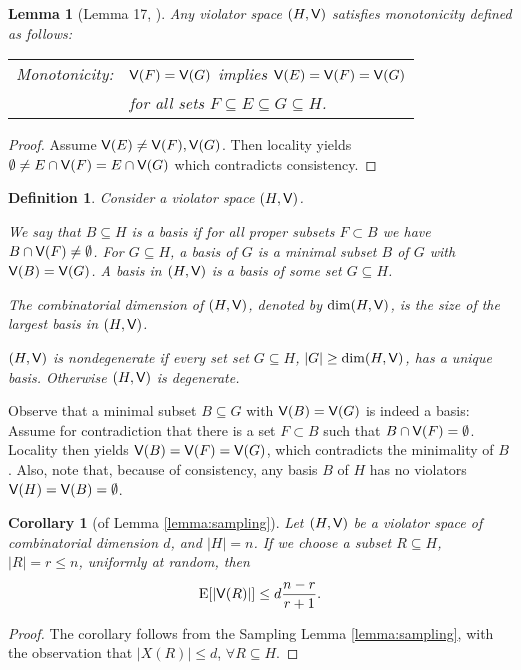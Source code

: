 \documentclass[12pt]{article}
\def\Exp{\qopname\relax m{E}}
\def\Violators{{\sf V}}
\newtheorem{lemma2}[theorem2]{Lemma}
\newenvironment{lemma}{\begin{lemma2}}{\end{lemma2}}
\newtheorem{corollary2}[theorem2]{Corollary}
\newenvironment{corollary}{\begin{corollary2}}{\end{corollary2}}
\newtheorem{definition2}[theorem2]{Definition}
\newenvironment{definition}{\begin{definition2}}{\end{definition2}}
\theoremstyle{remark}
\let\newItemize=\itemize
\renewenvironment{itemize}{\newItemize\itemsep=0.0cm}{\endlist}
\begin{document}
\begin{lemma}[Lemma 17, \cite{journals/dam/GartnerMRS08}]
\label{lemma:monotonicity}
Any violator space $(H,\Violators)$ satisfies \emph{monotonicity} defined as follows:

\vspace{0.2cm}
\begin{tabular}{ll}
	Monotonicity: & $\Violators(F) = \Violators(G)$ implies $\Violators(E) = \Violators(F)=
\Violators(G)$\\
	& for all sets $F\subseteq E \subseteq G \subseteq H$.
\end{tabular}  
\end{lemma}
\begin{proof}
Assume $\Violators(E)\neq\Violators(F),\Violators(G)$. Then locality yields
$\emptyset\neq E\cap\Violators(F)=E\cap \Violators(G)$ which contradicts consistency.
\end{proof}

\begin{definition}
Consider a violator space $(H,\Violators)$.
\begin{itemize}
\item[(i)]We say that $B\subseteq H$ is a \emph{basis}
if for all proper subsets $F\subset B$ we have $B\cap\Violators(F)\neq \emptyset$. For $G\subseteq 
H$, a basis of $G$ is a minimal subset $B$ of $G$ with $\Violators(B)=\Violators(G)$.
A basis in $(H,\Violators)$ is a basis of some set $G\subseteq H$.
\item[(ii)] The \emph{combinatorial dimension} of $(H,\Violators)$, denoted by $\dim(H,\Violators)$,
is the size of the largest basis in $(H,\Violators)$.
\item[(iii)] $(H,\Violators)$ is \emph{nondegenerate} if every set set $G\subseteq H$, $|G|\geq \dim(H,
\Violators)$,
has a unique basis. Otherwise $(H,\Violators)$ is \emph{degenerate}.
\end{itemize}
\end{definition}

Observe that a minimal subset $B\subseteq G$ with $\Violators(B)=\Violators(G)$ is indeed a basis:
Assume for contradiction that there is a set $F\subset B$ such that $B\cap\Violators(F)=\emptyset$.
Locality then yields $\Violators(B)=\Violators(F)=\Violators(G)$, which contradicts the minimality of $B$.
Also, note that, because of consistency, any basis $B$ of $H$ has no violators $\Violators(H)=\Violators(B) = \emptyset$.


\begin{corollary}[of Lemma \ref{lemma:sampling}]
Let $(H,\Violators)$ be a violator space of combinatorial dimension $d$, and $|H|=n$. If we choose
a subset $R\subseteq H$, $|R|=r \leq n$, uniformly at random, then
\[
	\Exp[|\Violators(R)|] \leq d \frac{n-r}{r+1}.
\]
\end{corollary}
\begin{proof}
The corollary follows from the Sampling Lemma \ref{lemma:sampling}, with the observation
that $|X(R)|\leq d$, $\forall R\subseteq H$.
\end{proof}
\end{document}
